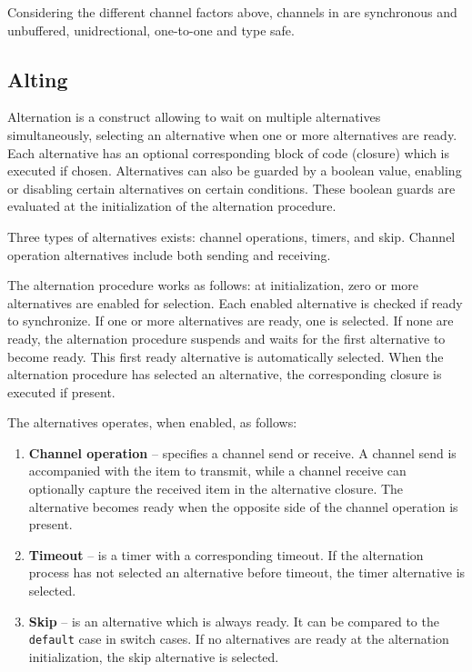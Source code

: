 Considering the different channel factors above, channels in \Proxc{} are synchronous and unbuffered, unidrectional, one\hyp{}to\hyp{}one and type safe.


\subsection{Alting}
\label{subsec:alting_design}


Alternation is a construct allowing to wait on multiple alternatives simultaneously, selecting an alternative when one or more alternatives are ready. Each alternative has an optional corresponding block of code (closure) which is executed if chosen. Alternatives can also be guarded by a boolean value, enabling or disabling certain alternatives on certain conditions. These boolean guards are evaluated at the initialization of the alternation procedure.

Three types of alternatives exists: channel operations, timers, and skip. Channel operation alternatives include both sending and receiving.

The alternation procedure works as follows: at initialization, zero or more alternatives are enabled for selection. Each enabled alternative is checked if ready to synchronize. If one or more alternatives are ready, one is selected. If none are ready, the alternation procedure suspends and waits for the first alternative to become ready. This first ready alternative is automatically selected. When the alternation procedure has selected an alternative, the corresponding closure is executed if present.

The alternatives operates, when enabled, as follows:

\begin{enumerate}[topsep=0em,itemsep=-1em,partopsep=0.5em,parsep=1em]
    \item \textbf{Channel operation} -- specifies a channel send or receive. A channel send is accompanied with the item to transmit, while a channel receive can optionally capture the received item in the alternative closure. The alternative becomes ready when the opposite side of the channel operation is present.
    \item \textbf{Timeout} -- is a timer with a corresponding timeout. If the alternation process has not selected an alternative before timeout, the timer alternative is selected.
    \item \textbf{Skip} -- is an alternative which is always ready. It can be compared to the \texttt{default} case in switch cases. If no alternatives are ready at the alternation initialization, the skip alternative is selected. 
\end{enumerate}

